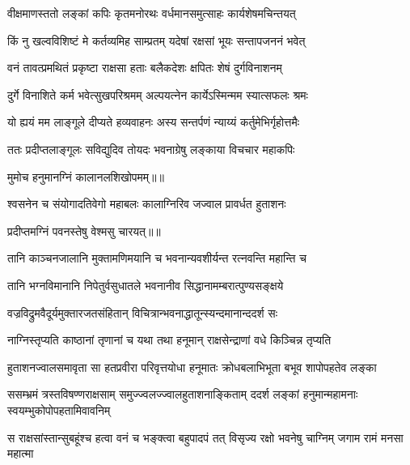 \twolineshloka
{वीक्षमाणस्ततो लङ्कां कपिः कृतमनोरथः}
{वर्धमानसमुत्साहः कार्यशेषमचिन्तयत्} %

\twolineshloka
{किं नु खल्वविशिष्टं मे कर्तव्यमिह साम्प्रतम्}
{यदेषां रक्षसां भूयः सन्तापजननं भवेत्} %

\twolineshloka
{वनं तावत्प्रमथितं प्रकृष्टा राक्षसा हताः}
{बलैकदेशः क्षपितः शेषं दुर्गविनाशनम्} %

\twolineshloka
{दुर्गे विनाशिते कर्म भवेत्सुखपरिश्रमम्}
{अल्पयत्नेन कार्येऽस्मिन्मम स्यात्सफलः श्रमः} %

\twolineshloka
{यो ह्ययं मम लाङ्गूले दीप्यते हव्यवाहनः}
{अस्य सन्तर्पणं न्याय्यं कर्तुमेभिर्गृहोत्तमैः} %

\twolineshloka
{ततः प्रदीप्तलाङ्गूलः सविद्युदिव तोयदः}
{भवनाग्रेषु लङ्काया विचचार महाकपिः} %

{मुमोच हनुमानग्निं कालानलशिखोपमम्॥॥} %

\addtocounter{shlokacount}{1}

\twolineshloka
{श्वसनेन च संयोगादतिवेगो महाबलः}
{कालाग्निरिव जज्वाल प्रावर्धत हुताशनः} %

{प्रदीप्तमग्निं पवनस्तेषु वेश्मसु चारयत्॥॥} %

\addtocounter{shlokacount}{1}

\twolineshloka
{तानि काञ्चनजालानि मुक्तामणिमयानि च}
{भवनान्यवशीर्यन्त रत्नवन्ति महान्ति च} %

\twolineshloka
{तानि भग्नविमानानि निपेतुर्वसुधातले}
{भवनानीव सिद्धानामम्बरात्पुण्यसङ्क्षये} %

\twolineshloka
{वज्रविद्रुमवैदूर्यमुक्तारजतसंहितान्}
{विचित्रान्भवनाद्धातून्स्यन्दमानान्ददर्श सः} %

\twolineshloka
{नाग्निस्तृप्यति काष्ठानां तृणानां च यथा तथा}
{हनूमान् राक्षसेन्द्राणां वधे किञ्चिन्न तृप्यति} %

\fourlineindentedshloka
{हुताशनज्वालसमावृता सा}
{हतप्रवीरा परिवृत्तयोधा}
{हनूमातः क्रोधबलाभिभूता}
{बभूव शापोपहतेव लङ्का} %

\fourlineindentedshloka
{ससम्भ्रमं त्रस्तविषण्णराक्षसाम्}
{समुज्ज्वलज्ज्वालहुताशनाङ्किताम्}
{ददर्श लङ्कां हनुमान्महामनाः}
{स्वयम्भुकोपोपहतामिवावनिम्} %

\fourlineindentedshloka
{स राक्षसांस्तान्सुबहूंश्च हत्वा}
{वनं च भङ्क्त्वा बहुपादपं तत्}
{विसृज्य रक्षो भवनेषु चाग्निम्}
{जगाम रामं मनसा महात्मा} %

